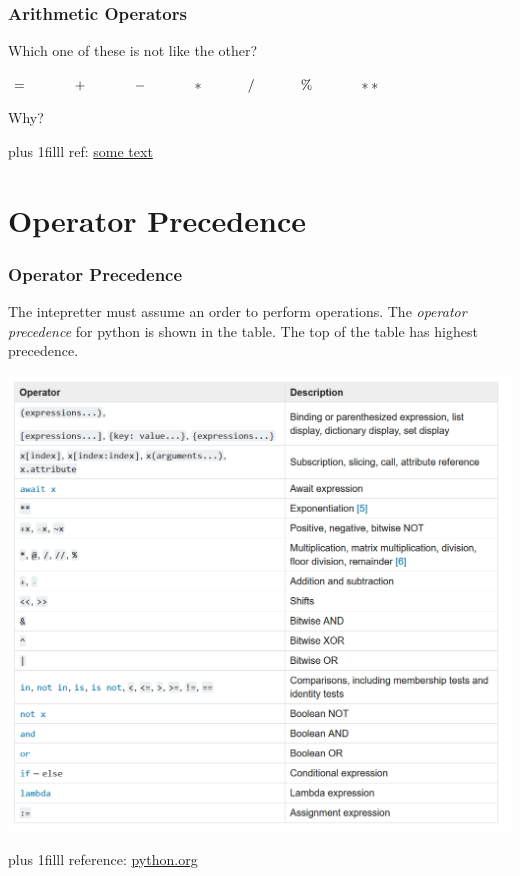 \documentclass[fleqn]{beamer} %
\newcommand{\sectiontitleII}{Arithmetic Operators}
\newcommand{\sectiontitleIII}{Operator Precedence}
\newcommand{\btVFill}{\vskip0pt plus 1filll}
\begin{document}
	\begin{frame} \small
		\frametitle{\sectiontitleII}
		
		\vspace{5MM}
		
		Which one of these is not like the other?
		
		\vspace{10mm}
		
		{\Large 	$= \hspace{12mm} + \hspace{12mm} - \hspace{12mm} * \hspace{12mm} / \hspace{12mm} \% \hspace{12mm} **$ }
		
		\vspace{10mm}
		
		Why?
		
		\btVFill
		\tiny{ref: \href{some link}{some text}}
	\end{frame}	


\section{\sectiontitleIII}

	\begin{frame}[label=sectionIII] \small
		\frametitle{\sectiontitleIII}
		
		\begin{multicols}{2}
		The intepretter must assume an order to perform operations. The {\it operator precedence} for python is shown in the table. The top of the table has highest precedence.

		\includegraphics[scale=.275]{operator_precedence_python.png}
		
		\end{multicols}
		\btVFill
		\tiny{reference: \href{https://docs.python.org/3/reference/expressions.html\#expression-lists}{python.org} }

	\end{frame}
\end{document}
